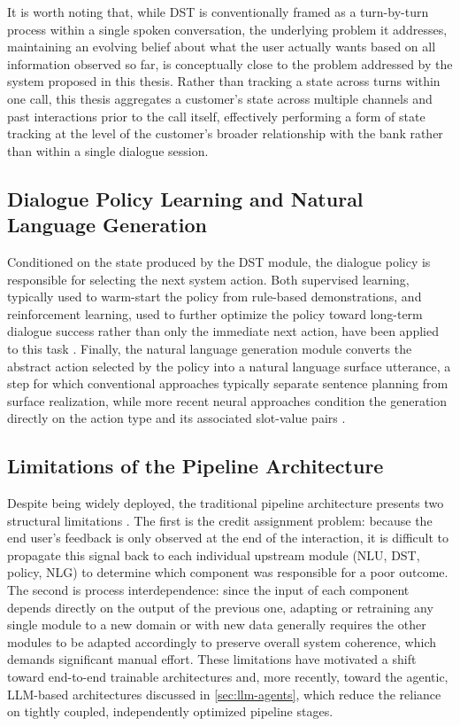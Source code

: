 \documentclass[12pt,a4paper,openright,twoside]{book}
\begin{document}
It is worth noting that, while DST is conventionally framed as a turn-by-turn process within a single spoken conversation,
the underlying problem it addresses, maintaining an evolving belief about what the user actually wants based on all information observed so far,
is conceptually close to the problem addressed by the system proposed in this thesis.
Rather than tracking a state across turns within one call, this thesis aggregates a customer's state across
multiple channels and past interactions prior to the call itself, effectively performing a form of state tracking
at the level of the customer's broader relationship with the bank rather than within a single dialogue session.

\subsection{Dialogue Policy Learning and Natural Language Generation}
Conditioned on the state produced by the DST module, the dialogue policy is responsible for selecting the next system action.
Both supervised learning, typically used to warm-start the policy from rule-based demonstrations, and reinforcement learning,
used to further optimize the policy toward long-term dialogue success rather than only the immediate next action, have been applied to this task \cite{chen2017survey}.
Finally, the natural language generation module converts the abstract action selected by the policy into a natural language surface utterance,
a step for which conventional approaches typically separate sentence planning from surface realization, while more recent neural approaches
condition the generation directly on the action type and its associated slot-value pairs \cite{chen2017survey}.

\subsection{Limitations of the Pipeline Architecture}
Despite being widely deployed, the traditional pipeline architecture presents two structural limitations \cite{chen2017survey}.
The first is the credit assignment problem: because the end user's feedback is only observed at the end of the interaction,
it is difficult to propagate this signal back to each individual upstream module (NLU, DST, policy, NLG) to determine which component
was responsible for a poor outcome. The second is process interdependence: since the input of each component depends directly on the
output of the previous one, adapting or retraining any single module to a new domain or with new data generally requires the other
modules to be adapted accordingly to preserve overall system coherence, which demands significant manual effort.
These limitations have motivated a shift toward end-to-end trainable architectures and, more recently, toward the agentic,
LLM-based architectures discussed in \cref{sec:llm-agents}, which reduce the reliance on tightly coupled, independently optimized pipeline stages.
\end{document}
